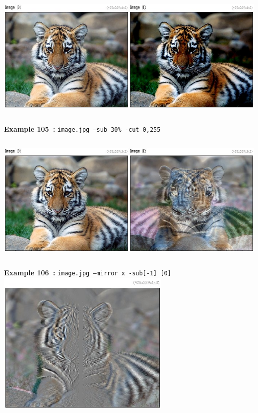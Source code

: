 \documentclass[a4paper,11pt,twoside]{book}
\begin{document}
\begin{center}\includegraphics[keepaspectratio=true,height=7cm,width=\textwidth]{img/gmic_def105.jpg}\\
{\footnotesize \textbf{Example 105~:} \texttt{image.jpg --sub 30\% -cut 0,255}}
\\\includegraphics[keepaspectratio=true,height=7cm,width=\textwidth]{img/gmic_def106.jpg}\\
{\footnotesize \textbf{Example 106~:} \texttt{image.jpg --mirror x -sub[-1] [0]}}
\\\includegraphics[keepaspectratio=true,height=7cm,width=\textwidth]{img/gmic_def107.jpg}\\

\end{center}
\end{document}

